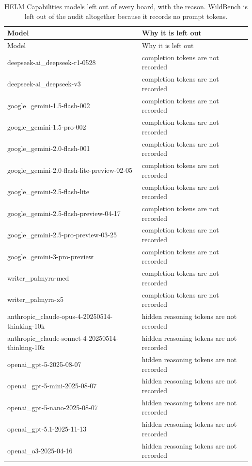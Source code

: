 \begin{longtable}{lp{7cm}}
\caption{HELM Capabilities models left out of every board, with the reason. WildBench is left out of the audit altogether because it records no prompt tokens.}\label{tab:supp-helm-dropped}\\
\toprule
Model & Why it is left out \\
\midrule
\endfirsthead
\toprule
Model & Why it is left out \\
\midrule
\endhead
\bottomrule
\endfoot
deepseek-ai\_deepseek-r1-0528 & completion tokens are not recorded \\
deepseek-ai\_deepseek-v3 & completion tokens are not recorded \\
google\_gemini-1.5-flash-002 & completion tokens are not recorded \\
google\_gemini-1.5-pro-002 & completion tokens are not recorded \\
google\_gemini-2.0-flash-001 & completion tokens are not recorded \\
google\_gemini-2.0-flash-lite-preview-02-05 & completion tokens are not recorded \\
google\_gemini-2.5-flash-lite & completion tokens are not recorded \\
google\_gemini-2.5-flash-preview-04-17 & completion tokens are not recorded \\
google\_gemini-2.5-pro-preview-03-25 & completion tokens are not recorded \\
google\_gemini-3-pro-preview & completion tokens are not recorded \\
writer\_palmyra-med & completion tokens are not recorded \\
writer\_palmyra-x5 & completion tokens are not recorded \\
anthropic\_claude-opus-4-20250514-thinking-10k & hidden reasoning tokens are not recorded \\
anthropic\_claude-sonnet-4-20250514-thinking-10k & hidden reasoning tokens are not recorded \\
openai\_gpt-5-2025-08-07 & hidden reasoning tokens are not recorded \\
openai\_gpt-5-mini-2025-08-07 & hidden reasoning tokens are not recorded \\
openai\_gpt-5-nano-2025-08-07 & hidden reasoning tokens are not recorded \\
openai\_gpt-5.1-2025-11-13 & hidden reasoning tokens are not recorded \\
openai\_o3-2025-04-16 & hidden reasoning tokens are not recorded \\

\end{longtable}
